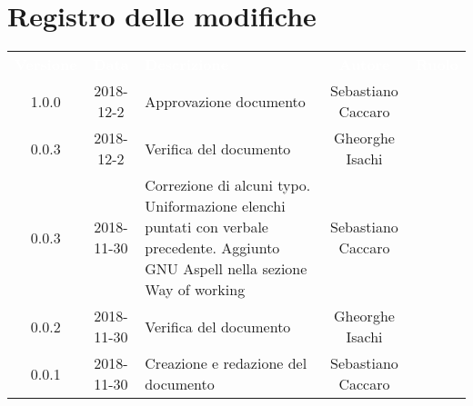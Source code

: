\section*{Registro delle modifiche}
{
	\renewcommand{\arraystretch}{1.5}
	\centering
	\begin{longtable}{ c c  C{4cm}  c  c }
		
		\textcolor{white}{\textbf{Versione}} & \textcolor{white}{\textbf{Data}} & \textcolor{white}{\textbf{Descrizione}} & \textcolor{white}{\textbf{Autore}} & \textcolor{white}{\textbf{Ruolo}}\\
				
		1.0.0 & 2018-12-2 & Approvazione documento & Sebastiano Caccaro & \reda{}\\		
		
		0.0.3 & 2018-12-2 & Verifica del documento & Gheorghe Isachi & \ver{}\\
		
		0.0.3 & 2018-11-30 & Correzione di alcuni typo. Uniformazione elenchi puntati
							con verbale precedente. Aggiunto GNU Aspell nella sezione
							Way of working & Sebastiano Caccaro & \reda{}\\
		
		0.0.2 & 2018-11-30 & Verifica del documento & Gheorghe Isachi & \ver{}\\
		
		0.0.1 & 2018-11-30 & Creazione e redazione del documento & Sebastiano Caccaro & \reda{}\\
		
	\end{longtable}

}